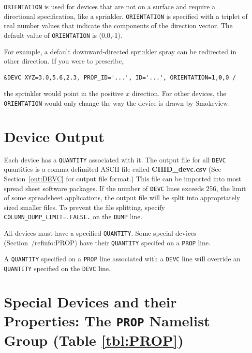 \documentclass[11pt]{book}
\newcommand{\ct}{\tt\small}
\begin{document}
{\ct ORIENTATION} is used for devices that are not on a surface
and require a directional specification, like a sprinkler. {\ct ORIENTATION} is specified with a
triplet of real number values that indicate the components of the direction vector.
The default value of {\ct ORIENTATION} is (0,0,-1).

For example, a default downward-directed sprinkler spray can be redirected in other direction.
If you were to prescribe,

\footnotesize
\begin{verbatim}
&DEVC XYZ=3.0,5.6,2.3, PROP_ID='...', ID='...', ORIENTATION=1,0,0 /
\end{verbatim}
\normalsize

\noindent
the sprinkler would point in the positive $x$ direction.
For other devices, the {\ct ORIENTATION} would only change the way the device is drawn by Smokeview.



\section{Device Output}
\label{info:out:DEVC}

Each device has a {\ct QUANTITY} associated with it.
The output file for all {\ct DEVC} quantities is a comma-delimited
ASCII file called {\bf CHID\_devc.csv} 
(See Section~\ref{out:DEVC} for output file format.)
This file can be imported into most spread sheet software packages.
If the number of {\ct DEVC} lines exceeds 256, the limit of some spreadsheet
applications, the output file will be split into appropriately sized smaller
files. To prevent the file splitting, specify {\ct COLUMN\_DUMP\_LIMIT=.FALSE.}
 on the {\ct DUMP} line.


\begin{warning}
All devices must have a specified {\ct QUANTITY}.  Some special devices (Section~/ref{info:PROP}) have their {\ct QUANTITY}
specifed on a {\ct PROP} line.
\end{warning}

\begin{warning}
A {\ct QUANTITY} specified on a {\ct PROP} line associated with a {\ct DEVC} line will override an {\ct QUANTITY}
specified on the {\ct DEVC} line.
\end{warning}


\section{Special Devices and their Properties: The \texorpdfstring{{\tt PROP}}{PROP} Namelist Group (Table \ref{tbl:PROP})}
\label{info:PROP} 
\end{document}
